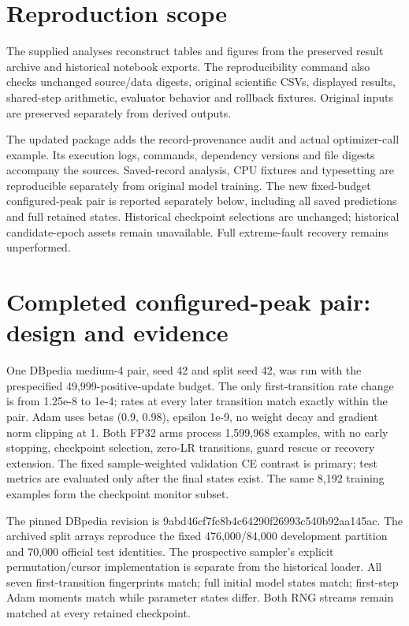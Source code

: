\documentclass[11pt,a4paper]{article}
\begin{document}
\section{Reproduction scope}\label{reproduction-scope}

The supplied analyses reconstruct tables and figures from the preserved result archive and historical notebook exports. The reproducibility command also checks unchanged source/data digests, original scientific CSVs, displayed results, shared-step arithmetic, evaluator behavior and rollback fixtures. Original inputs are preserved separately from derived outputs.

The updated package adds the record-provenance audit and actual optimizer-call example. Its execution logs, commands, dependency versions and file digests accompany the sources. Saved-record analysis, CPU fixtures and typesetting are reproducible separately from original model training. The new fixed-budget configured-peak pair is reported separately below, including all saved predictions and full retained states. Historical checkpoint selections are unchanged; historical candidate-epoch assets remain unavailable. Full extreme-fault recovery remains unperformed.

\section{Completed configured-peak pair: design and evidence}\label{completed-configured-peak-pair-design-and-evidence}

One DBpedia medium-4 pair, seed 42 and split seed 42, was run with the prespecified 49,999-positive-update budget. The only first-transition rate change is from 1.25e-8 to 1e-4; rates at every later transition match exactly within the pair. Adam uses betas (0.9, 0.98), epsilon 1e-9, no weight decay and gradient norm clipping at 1. Both FP32 arms process 1,599,968 examples, with no early stopping, checkpoint selection, zero-LR transitions, guard rescue or recovery extension. The fixed sample-weighted validation CE contrast is primary; test metrics are evaluated only after the final states exist. The same 8,192 training examples form the checkpoint monitor subset.

The pinned DBpedia revision is 9abd46cf7fc8b4c64290f26993c540b92aa145ac. The archived split arrays reproduce the fixed 476,000/84,000 development partition and 70,000 official test identities. The prospective sampler's explicit permutation/cursor implementation is separate from the historical loader. All seven first-transition fingerprints match; full initial model states match; first-step Adam moments match while parameter states differ. Both RNG streams remain matched at every retained checkpoint.
\end{document}
